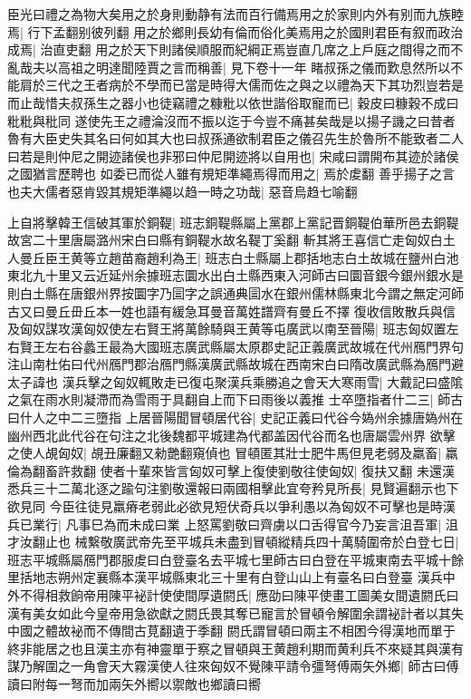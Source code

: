 臣光曰禮之為物大矣用之於身則動静有法而百行備焉用之於家則内外有别而九族睦焉|{
	行下孟翻别彼列翻}
用之於鄉則長幼有倫而俗化美焉用之於國則君臣有叙而政治成焉|{
	治直吏翻}
用之於天下則諸侯順服而紀綱正焉豈直几席之上戶庭之間得之而不亂哉夫以高祖之明達聞陸賈之言而稱善|{
	見下卷十一年}
睹叔孫之儀而歎息然所以不能肩於三代之王者病於不學而已當是時得大儒而佐之與之以禮為天下其功烈豈若是而止哉惜夫叔孫生之器小也徒竊禮之糠粃以依世諧俗取寵而已|{
	穀皮曰糠穀不成曰粃粃與秕同}
遂使先王之禮淪沒而不振以迄于今豈不痛甚矣哉是以揚子譏之曰昔者魯有大臣史失其名曰何如其大也曰叔孫通欲制君臣之儀召先生於魯所不能致者二人曰若是則仲尼之開迹諸侯也非邪曰仲尼開迹將以自用也|{
	宋咸曰謂開布其迹於諸侯之國猶言歷聘也}
如委已而從人雖有規矩準繩焉得而用之|{
	焉於䖍翻}
善乎揚子之言也夫大儒者惡肯毀其規矩準繩以趋一時之功哉|{
	惡音烏趋七喻翻}


上自將擊韓王信破其軍於銅鞮|{
	班志銅鞮縣屬上黨郡上黨記晋銅鞮伯華所邑去銅鞮故宮二十里唐屬潞州宋白曰縣有銅鞮水故名鞮丁奚翻}
斬其將王喜信亡走匈奴白土人曼丘臣王黄等立趙苗裔趙利為王|{
	班志白土縣屬上郡括地志白土故城在鹽州白池東北九十里又云近延州余據班志圜水出白土縣西東入河師古曰圜音銀今銀州銀水是則白土縣在唐銀州界按圜字乃圁字之誤通典圁水在銀州儒林縣東北今謂之無定河師古又曰曼丘毌丘本一姓也語有緩急耳曼音萬姓譜齊有曼丘不擇}
復收信敗散兵與信及匈奴謀攻漢匈奴使左右賢王將萬餘騎與王黄等屯廣武以南至晉陽|{
	班志匈奴置左右賢王左右谷蠡王最為大國班志廣武縣屬太原郡史記正義廣武故城在代州鴈門界句注山南杜佑曰代州鴈門郡治鴈門縣漢廣武縣故城在西南宋白曰隋改廣武縣為鴈門避太子諱也}
漢兵擊之匈奴輒敗走已復屯聚漢兵乘勝追之會天大寒雨雪|{
	大戴記曰盛隂之氣在雨水則凝滯而為雪雨于具翻自上而下曰雨後以義推}
士卒墮指者什二三|{
	師古曰什人之中二三墮指}
上居晉陽聞冒頓居代谷|{
	史記正義曰代谷今媯州余據唐媯州在幽州西北此代谷在句注之北後魏都平城建為代都盖因代谷而名也唐屬雲州界}
欲擊之使人覘匈奴|{
	覘丑廉翻又勑艷翻窺偵也}
冒頓匿其壯士肥牛馬但見老弱及羸畜|{
	羸倫為翻畜許救翻}
使者十輩來皆言匈奴可擊上復使劉敬往使匈奴|{
	復扶又翻}
未還漢悉兵三十二萬北逐之踰句注劉敬還報曰兩國相擊此宜夸矜見所長|{
	見賢遍翻示也下欲見同}
今臣往徒見羸瘠老弱此必欲見短伏奇兵以爭利愚以為匈奴不可擊也是時漢兵已業行|{
	凡事巳為而未成曰業}
上怒罵劉敬曰齊虜以口舌得官今乃妄言沮吾軍|{
	沮才汝翻止也}
械繫敬廣武帝先至平城兵未盡到冒頓縱精兵四十萬騎圍帝於白登七日|{
	班志平城縣屬鴈門郡服䖍曰白登臺名去平城七里師古曰白登在平城東南去平城十餘里括地志朔州定襄縣本漢平城縣東北三十里有白登山山上有臺名曰白登臺}
漢兵中外不得相救餉帝用陳平袐計使使間厚遺閼氏|{
	應劭曰陳平使畫工圖美女間遺閼氏曰漢有美女如此今皇帝用急欲獻之閼氏畏其奪已寵言於冒頓令解圍余謂袐計者以其失中國之體故袐而不傳間古莧翻遺于季翻}
閼氏謂冒頓曰兩主不相困今得漢地而單于終非能居之也且漢主亦有神靈單于察之冒頓與王黄趙利期而黄利兵不來疑其與漢有謀乃解圍之一角會天大霧漢使人往來匈奴不覺陳平請令彊弩傅兩矢外鄉|{
	師古曰傅讀曰附每一弩而加兩矢外嚮以禦敵也鄉讀曰嚮}
